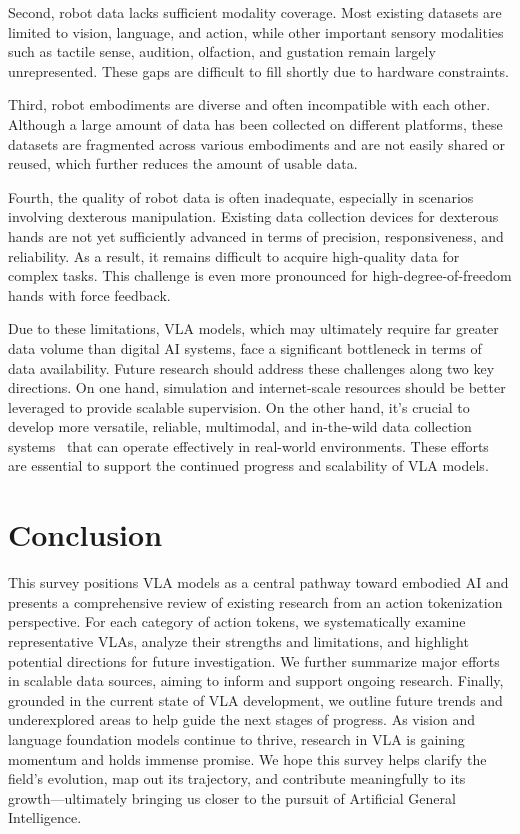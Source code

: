 \documentclass[10pt, a4paper, logo, copyright]{googledeepmind} %
\begin{document}
Second, robot data lacks sufficient modality coverage. Most existing datasets are limited to vision, language, and action, while other important sensory modalities such as tactile sense, audition, olfaction, and gustation remain largely unrepresented. These gaps are difficult to fill shortly due to hardware constraints.

Third, robot embodiments are diverse and often incompatible with each other. Although a large amount of data has been collected on different platforms, these datasets are fragmented across various embodiments and are not easily shared or reused, which further reduces the amount of usable data.

Fourth, the quality of robot data is often inadequate, especially in scenarios involving dexterous manipulation. Existing data collection devices for dexterous hands are not yet sufficiently advanced in terms of precision, responsiveness, and reliability. As a result, it remains difficult to acquire high-quality data for complex tasks. This challenge is even more pronounced for high-degree-of-freedom hands with force feedback.

Due to these limitations, VLA models, which may ultimately require far greater data volume than digital AI systems, face a significant bottleneck in terms of data availability. Future research should address these challenges along two key directions. On one hand, simulation and internet-scale resources should be better leveraged to provide scalable supervision. On the other hand, it’s crucial to develop more versatile, reliable, multimodal, and in-the-wild data collection systems~\cite{chi2024universal, xudexumi, wang2024dexcap} that can operate effectively in real-world environments. These efforts are essential to support the continued progress and scalability of VLA models.



\section{Conclusion}


This survey positions VLA models as a central pathway toward embodied AI and presents a comprehensive review of existing research from an action tokenization perspective. For each category of action tokens, we systematically examine representative VLAs, analyze their strengths and limitations, and highlight potential directions for future investigation. We further summarize major efforts in scalable data sources, aiming to inform and support ongoing research. Finally, grounded in the current state of VLA development, we outline future trends and underexplored areas to help guide the next stages of progress. As vision and language foundation models continue to thrive, research in VLA is gaining momentum and holds immense promise. We hope this survey helps clarify the field’s evolution, map out its trajectory, and contribute meaningfully to its growth---ultimately bringing us closer to the pursuit of Artificial General Intelligence.


\clearpage


\end{document}

